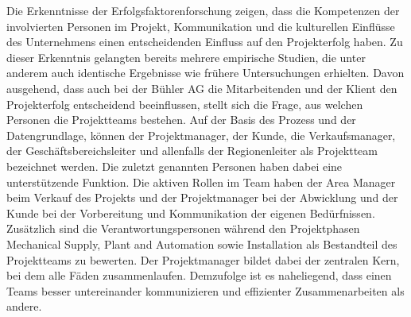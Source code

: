 \newline\newline
Die Erkenntnisse der Erfolgsfaktorenforschung zeigen, dass die Kompetenzen der involvierten Personen im Projekt, Kommunikation und die kulturellen Einflüsse des Unternehmens einen entscheidenden Einfluss auf den Projekterfolg haben. Zu dieser Erkenntnis gelangten bereits mehrere empirische Studien, die unter anderem auch identische Ergebnisse wie frühere Untersuchungen erhielten. Davon ausgehend, dass auch bei der Bühler AG die Mitarbeitenden und der Klient den Projekterfolg entscheidend beeinflussen, stellt sich die Frage, aus welchen Personen die Projektteams bestehen. Auf der Basis des Prozess und der Datengrundlage, können der Projektmanager, der Kunde, die Verkaufsmanager, der Geschäftsbereichsleiter und allenfalls der Regionenleiter als Projektteam bezeichnet werden. Die zuletzt genannten Personen haben dabei eine unterstützende Funktion. Die aktiven Rollen im Team haben der Area Manager beim Verkauf des Projekts und der Projektmanager bei der Abwicklung und der Kunde bei der Vorbereitung und Kommunikation der eigenen Bedürfnissen. Zusätzlich sind die Verantwortungspersonen während den Projektphasen Mechanical Supply, Plant and Automation sowie Installation als Bestandteil des Projektteams zu bewerten. Der Projektmanager bildet dabei der zentralen Kern, bei dem alle Fäden zusammenlaufen. Demzufolge ist es naheliegend, dass einen Teams besser untereinander kommunizieren und effizienter Zusammenarbeiten als andere. 


